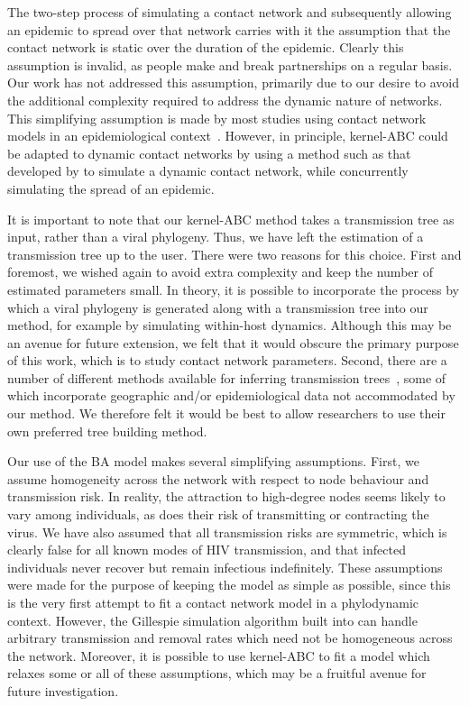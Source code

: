 
The two-step process of simulating a contact network and subsequently allowing
an epidemic to spread over that network carries with it the assumption that the
contact network is static over the duration of the epidemic. Clearly this
assumption is invalid, as people make and break partnerships on a regular
basis. Our work has not addressed this assumption, primarily due to our desire
to avoid the additional complexity required to address the dynamic nature of
networks. This simplifying assumption is made by most studies using contact
network models in an epidemiological context~\autocite{welch2011statistical,
bansal2007individual}. However, in principle, kernel-\gls{ABC} could be
adapted to dynamic contact networks by using a method such as that developed by
\textcite{robinson2012dynamics} to simulate a dynamic contact network, while
concurrently simulating the spread of an epidemic.


It is important to note that our kernel-ABC method takes a transmission tree as
input, rather than a viral phylogeny. Thus, we have left the estimation of a
transmission tree up to the user. There were two reasons for this choice. First
and foremost, we wished again to avoid extra complexity and keep the number of
estimated parameters small. In theory, it is possible to incorporate the
process by which a viral phylogeny is generated along with a transmission tree
into our method, for example by simulating within-host dynamics. Although this
may be an avenue for future extension, we felt that it would obscure the
primary purpose of this work, which is to study contact network parameters.
Second, there are a number of different methods available for inferring
transmission trees~\autocite{didelot2014bayesian, ypma2012unravelling,
jombart2011reconstructing, cottam2008integrating, poon2015phylodynamic}, some
of which incorporate geographic and/or epidemiological data not accommodated by
our method. We therefore felt it would be best to allow researchers to use
their own preferred tree building method.

Our use of the \gls{BA} model makes several simplifying assumptions. First, we
assume homogeneity across the network with respect to node behaviour and
transmission risk. In reality, the attraction to high-degree nodes seems likely
to vary among individuals, as does their risk of transmitting or contracting
the virus. We have also assumed that all transmission risks are symmetric,
which is clearly false for all known modes of \gls{HIV} transmission, and that
infected individuals never recover but remain infectious indefinitely. These
assumptions were made for the purpose of keeping the model as simple as
possible, since this is the very first attempt to fit a contact network model
in a phylodynamic context. However, the Gillespie simulation algorithm built
into  can handle arbitrary transmission and removal rates
which need not be homogeneous across the network. Moreover, it is possible to
use kernel-\gls{ABC} to fit a model which relaxes some or all of these
assumptions, which may be a fruitful avenue for future investigation.
